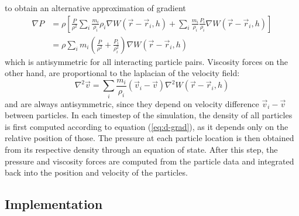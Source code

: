\documentclass{llncs}
\begin{document}
to obtain an alternative approximation of gradient
\begin{align}
  \label{eq:grad-est}
  \nabla P & = \rho \left[ \frac{P}{\rho^2} \sum_i \frac{m_i}{\rho_i} \rho_i \nabla
             W(\vec{r}-\vec{r}_i, h)
             +
             \sum_i \frac{m_i}{\rho_i} \frac{P_i}{\rho_i} \nabla W(\vec{r}-\vec{r}_i, h)
             \right] \nonumber \\
           & = \rho \sum_i m_i \left(\frac{P}{\rho^2} + \frac{P_i}{\rho_i^2} \right)
             \nabla W(\vec{r}-\vec{r}_i, h)
\end{align}
which is antisymmetric for all interacting particle pairs. Viscosity forces on the other
hand, are proportional to the laplacian of the velocity field:
\begin{equation}
  \label{eq:lapl-est}
  \nabla^2\vec{v} = \sum_i \frac{m_i}{\rho_i} (\vec{v}_i - \vec{v}) \nabla^2
  W(\vec{r}-\vec{r}_i, h)
\end{equation}
and are always antisymmetric, since they depend on velocity difference
$\vec{v}_i - \vec{v}$ between particles.  In each timestep of the simulation, the density
of all particles is first computed according to equation (\ref{eq:d-grad}), as it depends
only on the relative position of those. The pressure at each particle location is then
obtained from its respective density through an equation of state. After this step, the
pressure and viscosity forces are computed from the particle data and integrated back into
the position and velocity of the particles.

\subsection{Implementation}
\end{document}

